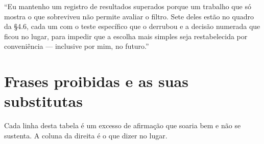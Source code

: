 \begin{nabanca}
``Eu mantenho um registro de resultados superados porque um trabalho que só
mostra o que sobreviveu não permite avaliar o filtro. Sete deles estão no
quadro da §4.6, cada um com o teste específico que o derrubou e a decisão
numerada que ficou no lugar, para impedir que a escolha mais simples seja
restabelecida por conveniência --- inclusive por mim, no futuro.''
\end{nabanca}

\chapter{Frases proibidas e as suas substitutas}
\label{cap:frases}

Cada linha desta tabela é um excesso de afirmação que soaria bem e não se
sustenta. A coluna da direita é o que dizer no lugar.

